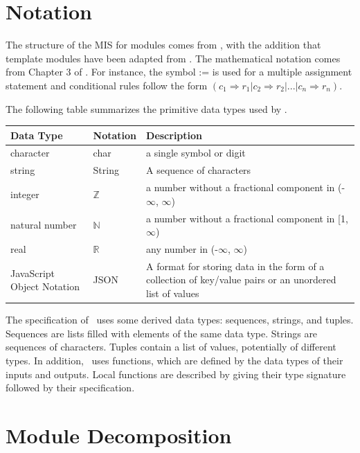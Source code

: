 \documentclass[12pt, titlepage]{article}
\begin{document}
\section{Notation}

The structure of the MIS for modules comes from \citet{HoffmanAndStrooper1995},
with the addition that template modules have been adapted from
\cite{GhezziEtAl2003}.  The mathematical notation comes from Chapter 3 of
\citet{HoffmanAndStrooper1995}.  For instance, the symbol := is used for a
multiple assignment statement and conditional rules follow the form $(c_1
\Rightarrow r_1 | c_2 \Rightarrow r_2 | ... | c_n \Rightarrow r_n )$.

The following table summarizes the primitive data types used by \progname. 

\begin{center}
\renewcommand{\arraystretch}{1.2}
\noindent 
\begin{tabular}{l l p{7.5cm}} 
\toprule 
\textbf{Data Type} & \textbf{Notation} & \textbf{Description}\\ 
\midrule
character & char & a single symbol or digit\\
string & String & A sequence of characters \\
integer & $\mathbb{Z}$ & a number without a fractional component in (-$\infty$, $\infty$) \\
natural number & $\mathbb{N}$ & a number without a fractional component in [1, $\infty$) \\
real & $\mathbb{R}$ & any number in (-$\infty$, $\infty$)\\
JavaScript Object Notation & JSON & A format for storing data in the form of a collection of key/value pairs or an unordered list of values\\
\bottomrule
\end{tabular} 
\end{center}

\noindent
The specification of \progname \ uses some derived data types: sequences, strings, and
tuples. Sequences are lists filled with elements of the same data type. Strings
are sequences of characters. Tuples contain a list of values, potentially of
different types. In addition, \progname \ uses functions, which
are defined by the data types of their inputs and outputs. Local functions are
described by giving their type signature followed by their specification.

\section{Module Decomposition}
\end{document}
